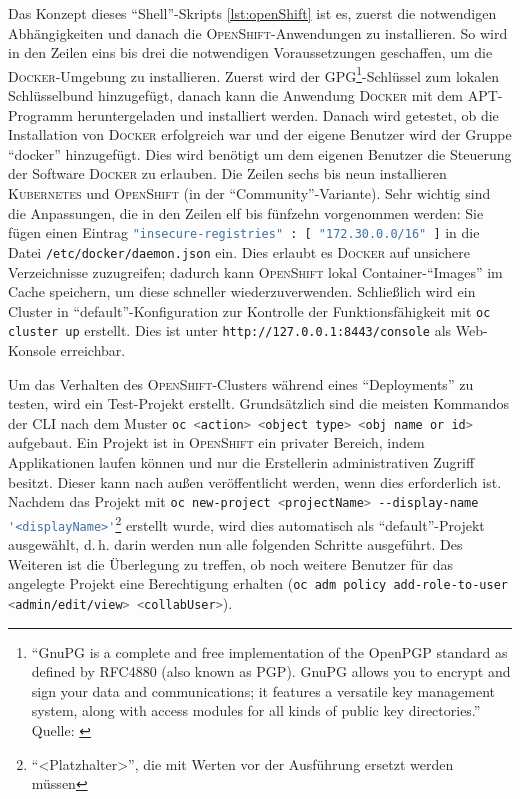 Das Konzept dieses \enquote{Shell}-Skripts \vref{lst:openShift} ist es, zuerst die notwendigen Abhängigkeiten und danach die \textsc{OpenShift}-Anwendungen zu installieren. So wird in den Zeilen eins bis drei die notwendigen Voraussetzungen geschaffen, um die \textsc{Docker}-Umgebung zu installieren. Zuerst wird der \textsc{GPG}\footnote{\enquote{GnuPG is a complete and free implementation of the OpenPGP standard as defined by RFC4880 (also known as PGP). GnuPG allows you to encrypt and sign your data and communications; it features a versatile key management system, along with access modules for all kinds of public key directories.} Quelle: \cite{the_people_of_the_gnupg_project_gnu_2020}}-Schlüssel zum lokalen Schlüsselbund hinzugefügt, danach kann die Anwendung \textsc{Docker} mit dem \ac{APT}-Programm heruntergeladen und installiert werden. Danach wird getestet, ob die Installation von \textsc{Docker} erfolgreich war und der eigene Benutzer wird der Gruppe \enquote{docker} hinzugefügt. Dies wird benötigt um dem eigenen Benutzer die Steuerung der Software \textsc{Docker} zu erlauben. Die Zeilen sechs bis neun installieren \textsc{Kubernetes} und \textsc{OpenShift} (in der \enquote{Community}-Variante). Sehr wichtig sind die Anpassungen, die in den Zeilen elf bis fünfzehn vorgenommen werden: Sie fügen einen Eintrag \lstinline[language=bash]|"insecure-registries" : [ "172.30.0.0/16" ]| in die Datei \lstinline[language=bash]|/etc/docker/daemon.json| ein. Dies erlaubt es \textsc{Docker} auf unsichere Verzeichnisse zuzugreifen; dadurch kann \textsc{OpenShift} lokal Container-\enquote{Images} im Cache speichern, um diese schneller wiederzuverwenden. Schließlich wird ein Cluster in \enquote{default}-Konfiguration zur Kontrolle der Funktionsfähigkeit mit \lstinline[language=bash]|oc cluster up| erstellt. Dies ist unter \lstinline[language=HTML, breaklines=true]|http://127.0.0.1:8443/console| als Web-Konsole erreichbar.
\par
Um das Verhalten des \textsc{OpenShift}-Clusters während eines \enquote{Deployments} zu testen, wird ein Test-Projekt erstellt. Grundsätzlich sind die meisten Kommandos der \ac{CLI} nach dem Muster \lstinline[language=sh]|oc <action> <object type> <obj name or id>|\autocite[vgl.][]{red_hat_inc_cli_2020} aufgebaut. Ein Projekt ist in \textsc{OpenShift} ein privater Bereich, indem Applikationen laufen können und nur die Erstellerin administrativen Zugriff besitzt. Dieser kann nach außen veröffentlicht werden, wenn dies erforderlich ist. Nachdem das Projekt mit \lstinline[language=bash]|oc new-project <projectName> --display-name '<displayName>'|\footnote{\enquote{<Platzhalter>}, die mit Werten vor der Ausführung ersetzt werden müssen} erstellt wurde, wird dies automatisch als \enquote{default}-Projekt ausgewählt, d.\,h. darin werden nun alle folgenden Schritte ausgeführt. Des Weiteren ist die Überlegung zu treffen, ob noch weitere Benutzer für das angelegte Projekt eine Berechtigung erhalten (\lstinline[language=bash]|oc adm policy add-role-to-user <admin/edit/view> <collabUser>|). 
